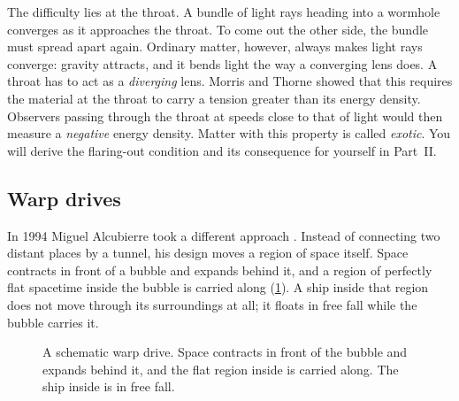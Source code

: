 The difficulty lies at the throat. A bundle of light rays heading into a
wormhole converges as it approaches the throat. To come out the other side, the
bundle must spread apart again. Ordinary matter, however, always makes light
rays converge: gravity attracts, and it bends light the way a converging lens
does. A throat has to act as a \emph{diverging} lens. Morris and Thorne showed
that this requires the material at the throat to carry a tension greater than
its energy density. Observers passing through the throat at speeds close to
that of light would then measure a \emph{negative} energy density. Matter with
this property is called \emph{exotic}. You will derive the flaring-out
condition and its consequence for yourself in Part~II.

\subsection{Warp drives}

In 1994 Miguel Alcubierre took a different approach \parencite{Alcubierre1994}.
Instead of connecting two distant places by a tunnel, his design moves a region
of space itself. Space contracts in front of a bubble and expands behind it,
and a region of perfectly flat spacetime inside the bubble is carried along
(\cref{fig:warp}). A ship inside that region does not move through its
surroundings at all; it floats in free fall while the bubble carries it.

\begin{figure}[htbp]
\centering
{}
\caption{A schematic warp drive. Space contracts in front of the bubble and
expands behind it, and the flat region inside is carried along. The ship inside
is in free fall.}
\label{fig:warp}
\end{figure}


